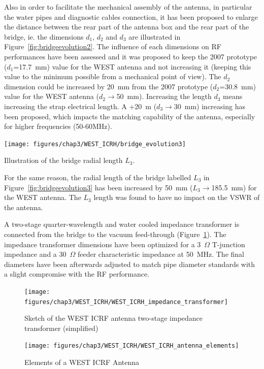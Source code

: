 {Also in order to facilitate the mechanical assembly of the antenna, in particular the water pipes and diagnostic cables connection, it has been proposed to enlarge the distance between the rear part of the antenna box and the rear part of the bridge, ie. the dimensions $d_1$, $d_2$ and $d_3$ are illustrated in Figure~\ref{fig:bridgeevolution2}. The influence of each dimensions on RF performances have been assessed and it was proposed to keep the 2007 prototype ($d_1$=17.7~mm) value for the WEST antenna and not increasing it (keeping this value to the minimum possible from a mechanical point of view). The $d_2$ dimension could be increased by 20~mm from the 2007 prototype ($d_2$=30.8~mm) value for the WEST antenna ($d_2\to$50~mm). Increasing the length $d_3$ means increasing the strap electrical length. A +20~m ($d_3\to$30~mm) increasing has been proposed, which impacts the matching capability of the antenna, especially for higher frequencies (50-60MHz). 

\begin{marginfigure}
	\centering
	\texttt{[image: figures/chap3/WEST\_ICRH/bridge\_evolution3]}
	\caption{Illustration of the bridge radial length $L_3$.}
	\label{fig:bridgeevolution3}
\end{marginfigure}

For the same reason, the radial length of the bridge labelled $L_3$ in Figure~\ref{fig:bridgeevolution3} has been increased by 50~mm ($L_3\to $185.5~mm) for the WEST antenna. The $L_3$ length was found to have no impact on the VSWR of the antenna. 

A two-stage quarter-wavelength and water cooled impedance transformer is connected from the bridge to the vacuum feed-through (Figure~\ref{fig:westicrhimpedancetransformer}). The impedance transformer dimensions have been optimized for a 3~$\si{\Omega}$ T-junction impedance and a 30~$\si{\Omega}$ feeder characteristic impedance at 50~MHz. The final diameters have been afterwards adjusted to match pipe diameter standards with a slight compromise with the RF performance. 

\begin{figure}
	\centering
	\texttt{[image: figures/chap3/WEST\_ICRH/WEST\_ICRH\_impedance\_transformer]}
	\caption{Sketch of the WEST ICRF antenna two-stage impedance transformer (simplified)}
	\label{fig:westicrhimpedancetransformer}
\end{figure}

\begin{figure}
	\centering
	\texttt{[image: figures/chap3/WEST\_ICRH/WEST\_ICRH\_antenna\_elements]}
	\caption{Elements of a WEST ICRF Antenna}
	\label{fig:westicrhantennaelements}
\end{figure}

}
